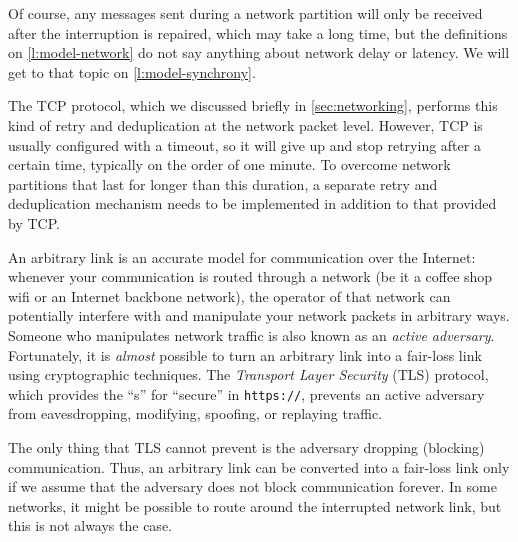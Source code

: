 Of course, any messages sent during a network partition will only be received after the interruption is repaired, which may take a long time, but the definitions on \autoref{l:model-network} do not say anything about network delay or latency.
We will get to that topic on \autoref{l:model-synchrony}.

The TCP protocol, which we discussed briefly in \autoref{sec:networking}, performs this kind of retry and deduplication at the network packet level.
However, TCP is usually configured with a timeout, so it will give up and stop retrying after a certain time, typically on the order of one minute.
To overcome network partitions that last for longer than this duration, a separate retry and deduplication mechanism needs to be implemented in addition to that provided by TCP.


An arbitrary link is an accurate model for communication over the Internet: whenever your communication is routed through a network (be it a coffee shop wifi or an Internet backbone network), the operator of that network can potentially interfere with and manipulate your network packets in arbitrary ways.
Someone who manipulates network traffic is also known as an \emph{active adversary}.
Fortunately, it is \emph{almost} possible to turn an arbitrary link into a fair-loss link using cryptographic techniques.
The \emph{Transport Layer Security} (TLS) protocol, which provides the ``s'' for ``secure'' in \verb|https://|, prevents an active adversary from eavesdropping, modifying, spoofing, or replaying traffic.

The only thing that TLS cannot prevent is the adversary dropping (blocking) communication.
Thus, an arbitrary link can be converted into a fair-loss link only if we assume that the adversary does not block communication forever.
In some networks, it might be possible to route around the interrupted network link, but this is not always the case.

